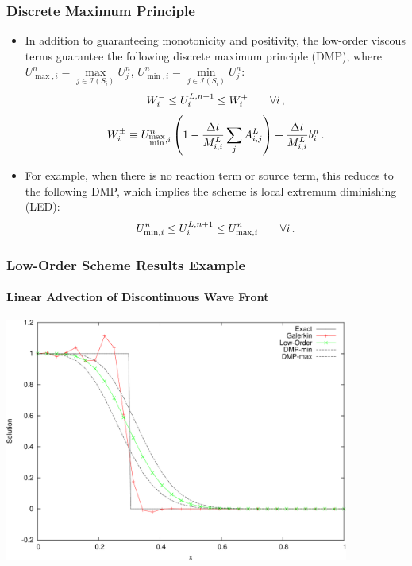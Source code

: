 \documentclass{beamer} \useoutertheme{infolines}
\begin{document}
\begin{frame}
\frametitle{Discrete Maximum Principle}

\begin{itemize}
   \item In addition to guaranteeing monotonicity and positivity, the low-order
      viscous terms guarantee the following discrete maximum principle (DMP),
      where $U^n_{\max,i} = \max\limits_{j\in\mathcal{I}(S_i)}U^n_j$,
      $U^n_{\min,i} = \min\limits_{j\in\mathcal{I}(S_i)}U^n_j$:
      \begin{equation}
         W_i^-\leq
         U_i^{L,n+1}\leq
         W_i^+\qquad\forall i \,,
      \end{equation}
      \begin{equation}
         W_i^\pm \equiv U_{\substack{\max\\\min},i}^n\left(
         1-\frac{\Delta t}{M_{i,i}^L}
         \sum\limits_j A_{i,j}^L\right)
         + \frac{\Delta t}{M_{i,i}^L}b_i^n \,.
      \end{equation}
   \item For example, when there is no reaction term or source term, this reduces
      to the following DMP, which implies the scheme is local extremum
      diminishing (LED):
      \begin{equation}
         U^n_{\min,i}\leq
         U_i^{L,n+1}\leq
         U^n_{\max,i}\qquad\forall i \,.
      \end{equation}
\end{itemize}

\end{frame}
\begin{frame}
\frametitle{Low-Order Scheme Results Example}
\framesubtitle{Linear Advection of Discontinuous Wave Front}

\begin{center}
\includegraphics[width=0.85\textwidth]{./figures/advection_low_order.pdf}
\end{center}

\end{frame}
\end{document}
